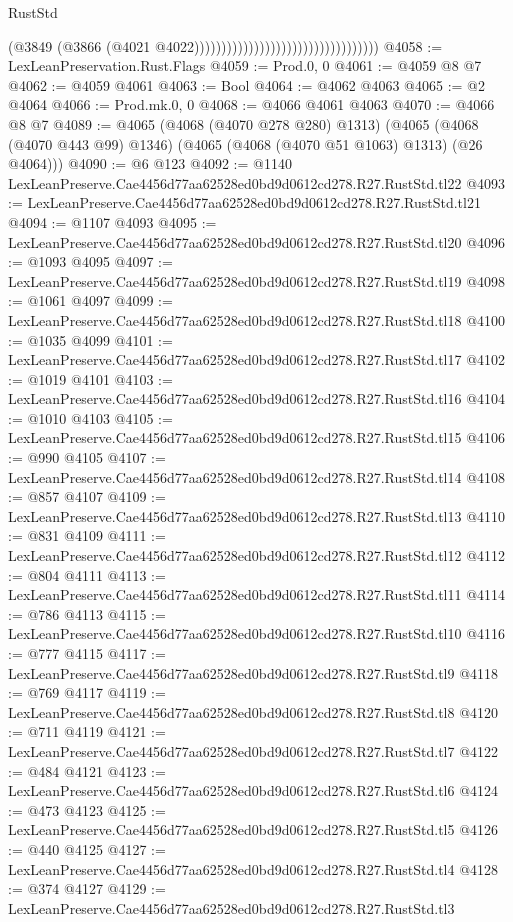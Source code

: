 \begin{lexlean}{RustStd}
\begin{coremodule}
                                                                  (@3849
                                                                    (@3866
                                                                      (@4021
                                                                        @4022))))))))))))))))))))))))))))))))))
@4058 := LexLeanPreservation.Rust.Flags
@4059 := Prod.{0, 0}
@4061 := @4059 @8 @7
@4062 := @4059 @4061
@4063 := Bool
@4064 := @4062 @4063
@4065 := @2 @4064
@4066 := Prod.mk.{0, 0}
@4068 := @4066 @4061 @4063
@4070 := @4066 @8 @7
@4089 := @4065
    (@4068 (@4070 @278 @280) @1313)
    (@4065 (@4068 (@4070 @443 @99) @1346) (@4065 (@4068 (@4070 @51 @1063) @1313) (@26 @4064)))
@4090 := @6 @123
@4092 := @1140 LexLeanPreserve.Cae4456d77aa62528ed0bd9d0612cd278.R27.RustStd.tl22
@4093 := LexLeanPreserve.Cae4456d77aa62528ed0bd9d0612cd278.R27.RustStd.tl21
@4094 := @1107 @4093
@4095 := LexLeanPreserve.Cae4456d77aa62528ed0bd9d0612cd278.R27.RustStd.tl20
@4096 := @1093 @4095
@4097 := LexLeanPreserve.Cae4456d77aa62528ed0bd9d0612cd278.R27.RustStd.tl19
@4098 := @1061 @4097
@4099 := LexLeanPreserve.Cae4456d77aa62528ed0bd9d0612cd278.R27.RustStd.tl18
@4100 := @1035 @4099
@4101 := LexLeanPreserve.Cae4456d77aa62528ed0bd9d0612cd278.R27.RustStd.tl17
@4102 := @1019 @4101
@4103 := LexLeanPreserve.Cae4456d77aa62528ed0bd9d0612cd278.R27.RustStd.tl16
@4104 := @1010 @4103
@4105 := LexLeanPreserve.Cae4456d77aa62528ed0bd9d0612cd278.R27.RustStd.tl15
@4106 := @990 @4105
@4107 := LexLeanPreserve.Cae4456d77aa62528ed0bd9d0612cd278.R27.RustStd.tl14
@4108 := @857 @4107
@4109 := LexLeanPreserve.Cae4456d77aa62528ed0bd9d0612cd278.R27.RustStd.tl13
@4110 := @831 @4109
@4111 := LexLeanPreserve.Cae4456d77aa62528ed0bd9d0612cd278.R27.RustStd.tl12
@4112 := @804 @4111
@4113 := LexLeanPreserve.Cae4456d77aa62528ed0bd9d0612cd278.R27.RustStd.tl11
@4114 := @786 @4113
@4115 := LexLeanPreserve.Cae4456d77aa62528ed0bd9d0612cd278.R27.RustStd.tl10
@4116 := @777 @4115
@4117 := LexLeanPreserve.Cae4456d77aa62528ed0bd9d0612cd278.R27.RustStd.tl9
@4118 := @769 @4117
@4119 := LexLeanPreserve.Cae4456d77aa62528ed0bd9d0612cd278.R27.RustStd.tl8
@4120 := @711 @4119
@4121 := LexLeanPreserve.Cae4456d77aa62528ed0bd9d0612cd278.R27.RustStd.tl7
@4122 := @484 @4121
@4123 := LexLeanPreserve.Cae4456d77aa62528ed0bd9d0612cd278.R27.RustStd.tl6
@4124 := @473 @4123
@4125 := LexLeanPreserve.Cae4456d77aa62528ed0bd9d0612cd278.R27.RustStd.tl5
@4126 := @440 @4125
@4127 := LexLeanPreserve.Cae4456d77aa62528ed0bd9d0612cd278.R27.RustStd.tl4
@4128 := @374 @4127
@4129 := LexLeanPreserve.Cae4456d77aa62528ed0bd9d0612cd278.R27.RustStd.tl3

\end{coremodule}
\end{lexlean}
